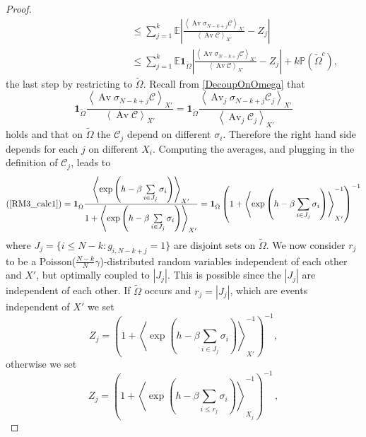 \documentclass[a4paper,12pt,oneside,reqno]{amsart}
\numberwithin{equation}{section}
\begin{document}
\begin{proof}
\[\begin{aligned}
& \hspace{4cm} \leq \sum\limits_{j=1}^k {{\mathbb{E}}} \left|\frac{\left<\operatorname{Av} \sigma_{N-k+j}\mathcal{C}\right>_{X'}}{\left<\operatorname{Av} \mathcal{C}\right>_{X'}} - Z_j\right| \\
& \hspace{4cm} \leq \sum\limits_{j=1}^k {{\mathbb{E}}} \boldsymbol{1}_{\tilde \Omega}\left|\frac{\left<\operatorname{Av} \sigma_{N-k+j}\mathcal{C}\right>_{X'}}{\left<\operatorname{Av} \mathcal{C}\right>_{X'}} - Z_j\right| + k{\mathbb{P}}(\tilde \Omega^c), 
\end{aligned} \]
the last step by restricting to $\tilde \Omega$. Recall from \eqref{DecoupOnOmega} that 
\begin{equation}\label{RM3_calc1}
\boldsymbol{1}_{\tilde \Omega}\frac{\left<\operatorname{Av} \sigma_{N-k+j}\mathcal{C}\right>_{X'}}{\left<\operatorname{Av} \mathcal{C}\right>_{X'}} =  \boldsymbol{1}_{\tilde \Omega}\frac{\left<\operatorname{Av}_j \sigma_{N-k+j} \mathcal{C}_j \right>_{X'}}{\left<\operatorname{Av}_j \mathcal{C}_j\right>_{X'}}
\end{equation}
holds and that on $\tilde \Omega$ the $\mathcal{C}_j$ depend on different $\sigma_i$. Therefore the right hand side depends for each $j$ on different $X_i$. Computing the averages, and plugging in the definition of $\mathcal{C}_j$, leads to 
\[
(\ref{RM3_calc1}) = \boldsymbol{1}_{\tilde \Omega}\frac{\left<\exp\left(h-\beta\sum\limits_{i\in J_j} \sigma_i\right)\right>_{X'}}{1+\left<\exp\left(h-\beta\sum\limits_{i\in J_j} \sigma_i\right)\right>_{X'}} = \boldsymbol{1}_{\tilde \Omega}\left(1+ \left<\exp\left(h-\beta\sum\limits_{i\in J_j} \sigma_i\right)\right>_{X'}^{-1}\right)^{-1}
\]
where $J_j = \{i\leq N-k: g_{i,N-k+j} = 1\}$ are disjoint sets on $\tilde \Omega$. We now consider $r_j$ to be a Poisson($\frac{N-k}{N}\gamma$)-distributed random variables independent of each other and $X'$, but optimally coupled to $|J_j|$. This is possible since the $|J_j|$ are independent of each other. If $\tilde \Omega$ occurs and $r_j = |J_j|$, which are events independent of $X'$ we set 
\begin{equation} \label{uno}
Z_j = \left(1+ \left<\exp\left(h-\beta\sum\limits_{i\in J_j} \sigma_i\right)\right>_{X'}^{-1}\right)^{-1},
\end{equation}
otherwise we set
\begin{equation} \label{due}
Z_j = \left(1+ \left<\exp\left(h-\beta\sum\limits_{i\leq r_j} \sigma_i\right)\right>_{X_j}^{-1}\right)^{-1}\,,
\end{equation}

\end{proof}
\end{document}
